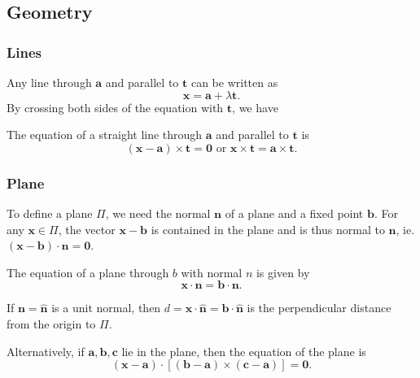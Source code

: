 \documentclass[a4paper]{article}
\begin{document}
\subsection{Geometry}
\subsubsection{Lines}
Any line through $\mathbf{a}$ and parallel to $\mathbf{t}$ can be written as
\[
  \mathbf{x} = \mathbf{a} + \lambda\mathbf{t}.
\]
By crossing both sides of the equation with $\mathbf{t}$, we have
\begin{thm} The equation of a straight line through $\mathbf{a}$ and parallel to $\mathbf{t}$ is
  \[
    \mathbf{(x - a)\times t = 0}\text{ or }\mathbf{x\times t = a\times t}.
  \]
\end{thm}
\subsubsection{Plane}
To define a plane $\Pi$, we need the normal $\mathbf{n}$ of a plane and a fixed point $\mathbf{b}$.  For any $\mathbf{x}\in \Pi$, the vector $\mathbf{x - b}$ is contained in the plane and is thus normal to $\mathbf{n}$, ie. $\mathbf{(x - b)\cdot n = 0}$.
\begin{thm}
  The equation of a plane through $b$ with normal $n$ is given by
  \[
    \mathbf{x\cdot n = b\cdot n}.
  \]
\end{thm}
If $\mathbf{n = \hat n}$ is a unit normal, then $d = \mathbf{x\cdot\hat{n} = b\cdot\hat{n}}$ is the perpendicular distance from the origin to $\Pi$.

Alternatively, if $\mathbf{a, b, c}$ lie in the plane, then the equation of the plane is
\[
  \mathbf{(x - a)\cdot [(b - a)\times (c - a)] = 0}.
\]
\end{document}
